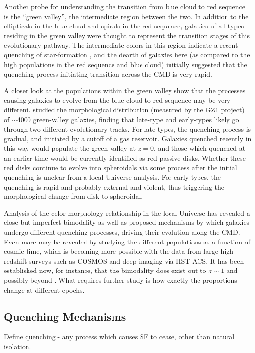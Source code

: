 Another probe for understanding the transition from blue cloud to red sequence is the ``green valley'', the intermediate region between the two. In addition to the ellipticals in the blue cloud and spirals in the red sequence, galaxies of all types residing in the green valley were thought to represent the transition stages of this evolutionary pathway. The intermediate colors in this region indicate a recent quenching of star-formation \citep{Martin2007,Salim2007}, and the dearth of galaxies here (as compared to the high populations in the red sequence and blue cloud) initially suggested that the quenching process initiating transition across the CMD is very rapid.

A closer look at the populations within the green valley show that the processes causing galaxies to evolve from the blue cloud to red sequence may be very different. \citet{Schawinski2009} studied the morphological distribution (measured by the GZ1 project) of $\sim$4000 green-valley galaxies, finding that late-type and early-types likely go through two different evolutionary tracks. For late-types, the quenching process is gradual, and initiated by a cutoff of a gas reservoir. Galaxies quenched recently in this way would populate the green valley at $z=0$, and those which quenched at an earlier time would be currently identified as red passive disks. Whether these red disks continue to evolve into spheroidals via some process after the initial quenching is unclear from a local Universe analysis. For early-types, the quenching is rapid and probably external and violent, thus triggering the morphological change from disk to spheroidal.  

Analysis of the color-morphology relationship in the local Universe has revealed a close but imperfect bimodality as well as proposed mechanisms by which galaxies undergo different quenching processes, driving their evolution along the CMD. Even more may be revealed by studying the different populations as a function of cosmic time, which is becoming more possible with the data from large high-redshift surveys such as COSMOS and deep imaging via HST-ACS. It has been established now, for instance, that the bimodality does exist out to $z\sim1$ \citep{Bell2004,Cirasuolo2007,Mignoli2009} and possibly beyond \citep{Giallongo2005,VanDokkum2006,Franzetti2007,Cassata2008}. What requires further study is how exactly the proportions change at different epochs.



\subsection{Quenching Mechanisms}
\label{ssec:qmechs}
Define quenching - any process which causes SF to cease, other than natural isolation. 
